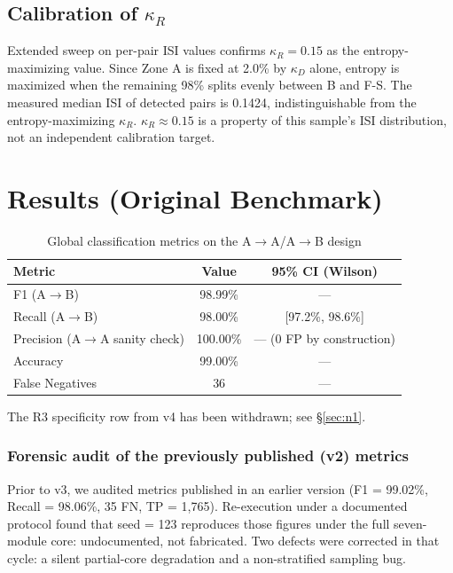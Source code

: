 \documentclass[11pt,a4paper]{article}
\begin{document}
\subsection{Calibration of $\kappa_R$}

Extended sweep on per-pair ISI values confirms $\kappa_R = 0.15$ as the entropy-maximizing value. Since Zone A is fixed at 2.0\% by $\kappa_D$ alone, entropy is maximized when the remaining 98\% splits evenly between B and F-S. The measured median ISI of detected pairs is 0.1424, indistinguishable from the entropy-maximizing $\kappa_R$. $\kappa_R \approx 0.15$ is a property of this sample's ISI distribution, not an independent calibration target.

\section{Results (Original Benchmark)}
\label{sec:original-results}

\begin{table}[H]
\centering
\caption{Global classification metrics on the A$\rightarrow$A/A$\rightarrow$B design}
\label{tab:global}
\begin{tabular}{@{}lcc@{}}
\toprule
Metric & Value & 95\% CI (Wilson) \\
\midrule
F1 (A$\rightarrow$B) & 98.99\% & --- \\
Recall (A$\rightarrow$B) & 98.00\% & [97.2\%, 98.6\%] \\
Precision (A$\rightarrow$A sanity check) & 100.00\% & --- (0 FP by construction) \\
Accuracy & 99.00\% & --- \\
False Negatives & 36 & --- \\
\bottomrule
\end{tabular}
\begin{flushleft}
\small The R3 specificity row from v4 has been withdrawn; see \S\ref{sec:n1}.
\end{flushleft}
\end{table}

\subsubsection{Forensic audit of the previously published (v2) metrics}
\label{sec:v2-audit}

Prior to v3, we audited metrics published in an earlier version (F1 = 99.02\%, Recall = 98.06\%, 35 FN, TP = 1{,}765). Re-execution under a documented protocol found that seed = 123 reproduces those figures under the full seven-module core: undocumented, not fabricated. Two defects were corrected in that cycle: a silent partial-core degradation and a non-stratified sampling bug.
\end{document}
